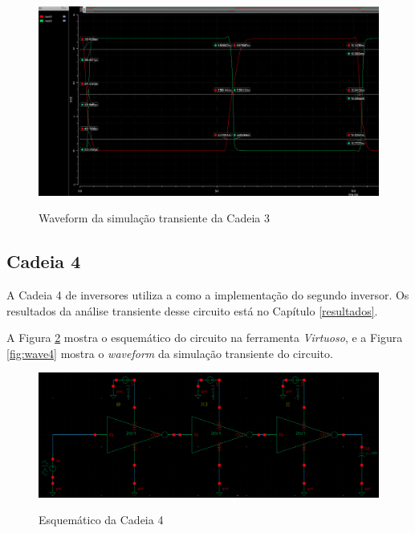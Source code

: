 \documentclass{iiufrgs}
\newcommand{\virtuoso}{\textit{Virtuoso}}
\begin{document}
\begin{figure}[htbp]
    \centering
    \caption{Waveform da simulação transiente da Cadeia 3}
    \includegraphics[scale=0.4]{images/wave_ex3.png}
    \label{fig:wave3}
\end{figure}

\FloatBarrier

\subsection{Cadeia 4}
A Cadeia 4 de inversores utiliza a  como a implementação do segundo inversor. Os resultados da análise transiente desse circuito está no Capítulo \ref{resultados}.\

A Figura \ref{fig:circ_e4} mostra o esquemático do circuito na ferramenta \virtuoso, e a Figura \ref{fig:wave4} mostra o \textit{waveform} da simulação transiente do circuito.\

\begin{figure}[htbp]
    \centering
    \caption{Esquemático da Cadeia 4}
    \includegraphics[scale=0.33]{images/circ4.png}
    \label{fig:circ_e4}
\end{figure}
\end{document}
